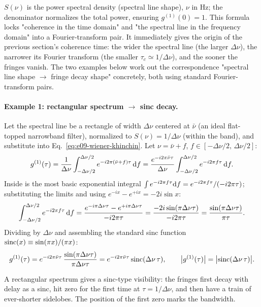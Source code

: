 \(S(\nu)\) is the power spectral density (spectral line shape), \(\nu\) in Hz; the denominator normalizes the total power, ensuring \(g^{(1)}(0)=1\). This formula locks "coherence in the time domain" and "the spectral line in the frequency domain" into a Fourier-transform pair. It immediately gives the origin of the previous section's coherence time: the wider the spectral line (the larger \(\Delta\nu\)), the narrower its Fourier transform (the smaller \(\tau_c\simeq1/\Delta\nu\)), and the sooner the fringes vanish. The two examples below work out the correspondence "spectral line shape \(\to\) fringe decay shape" concretely, both using standard Fourier-transform pairs.

\paragraph{Example 1: rectangular spectrum \(\to\) sinc decay.} Let the spectral line be a rectangle of width \(\Delta\nu\) centered at \(\bar\nu\) (an ideal flat-topped narrowband filter), normalized to \(S(\nu)=1/\Delta\nu\) (within the band), and substitute into Eq.~\eqref{eq:e09-wiener-khinchin}. Let \(\nu=\bar\nu+f\), \(f\in[-\Delta\nu/2,\,\Delta\nu/2]\):
\[
  g^{(1)}(\tau)=\frac{1}{\Delta\nu}\int_{-\Delta\nu/2}^{\Delta\nu/2}
  e^{-i2\pi(\bar\nu+f)\tau}\,{\rm d}f
  =\frac{e^{-i2\pi\bar\nu\tau}}{\Delta\nu}
  \int_{-\Delta\nu/2}^{\Delta\nu/2}e^{-i2\pi f\tau}\,{\rm d}f .
\]
Inside is the most basic exponential integral \(\int e^{-i2\pi f\tau}{\rm d}f=e^{-i2\pi f\tau}/(-i2\pi\tau)\); substituting the limits and using \(e^{-ix}-e^{+ix}=-2i\sin x\):
\[
  \int_{-\Delta\nu/2}^{\Delta\nu/2}e^{-i2\pi f\tau}\,{\rm d}f
  =\frac{e^{-i\pi\Delta\nu\tau}-e^{+i\pi\Delta\nu\tau}}{-i2\pi\tau}
  =\frac{-2i\sin(\pi\Delta\nu\tau)}{-i2\pi\tau}
  =\frac{\sin(\pi\Delta\nu\tau)}{\pi\tau} .
\]
Dividing by \(\Delta\nu\) and assembling the standard sinc function \({\rm sinc}(x)\equiv\sin(\pi x)/(\pi x)\):
\begin{equation}
  g^{(1)}(\tau)=e^{-i2\pi\bar\nu\tau}\,\frac{\sin(\pi\Delta\nu\tau)}{\pi\Delta\nu\tau}
  =e^{-i2\pi\bar\nu\tau}\,{\rm sinc}(\Delta\nu\,\tau),
  \qquad
  \big|g^{(1)}(\tau)\big|=\big|{\rm sinc}(\Delta\nu\,\tau)\big| .
  \label{eq:e09-rect-sinc}
\end{equation}
\begin{formulaexplain}
A rectangular spectrum gives a sinc-type visibility: the fringes first decay with delay as a sinc, hit zero for the first time at \(\tau=1/\Delta\nu\), and then have a train of ever-shorter sidelobes. The position of the first zero marks the bandwidth.
\end{formulaexplain}
